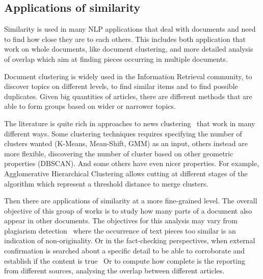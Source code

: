 \subsection{Applications of similarity}

Similarity is used in many NLP applications that deal with documents and need to find how close they are to each others. This includes both application that work on whole documents, like document clustering, and more detailed analysis of overlap which aim at finding pieces occurring in multiple documents.

Document clustering is widely used in the Information Retrieval community, to discover topics on different levels, to find similar items and to find possible duplicates. Given big quantities of articles, there are different methods that are able to form groups based on wider or narrower topics.

The literature is quite rich in approaches to news clustering~\cite{carpineto2009survey,jones1972statistical} %
that work in many different ways.
Some clustering techniques requires specifying the number of clusters wanted (K-Means, Mean-Shift, GMM) as an input, others instead are more flexible, discovering the number of cluster based on other geometric properties (DBSCAN).
And some others have even nicer properties.
For example, Agglomerative Hierarchical Clustering allows cutting at different stages of the algorithm which represent a threshold distance to merge clusters.






Then there are applications of similarity at a more fine-grained level.
The overall objective of this group of works is to study how many parts of a document also appear in other documents.
The objectives for this analysis may vary from plagiarism detection~\cite{potthast2010evaluation} where the occurrence of text pieces too similar is an indication of non-originality.
Or in the fact-checking perspectives, when external confirmation is searched about a specific detail to be able to corroborate and establish if the content is true~\cite{karadzhov2017fully}
Or to compute how complete is the reporting from different sources, analysing the overlap between different articles.

